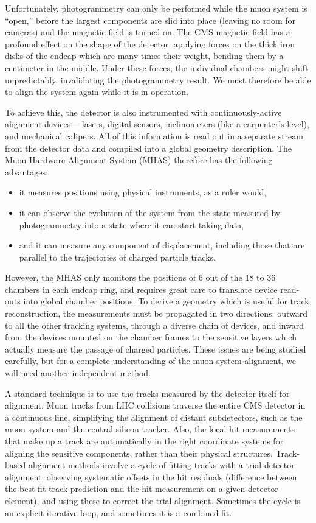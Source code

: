 \documentclass[12pt]{article}
\begin{document}
Unfortunately, photogrammetry can only be performed while the muon
system is ``open,'' before the largest components are slid into place
(leaving no room for cameras) and the magnetic field is turned on.
The CMS magnetic field has a profound effect on the shape of the
detector, applying forces on the thick iron disks of the endcap which
are many times their weight, bending them by a centimeter in the
middle.  Under these forces, the individual chambers might shift
unpredictably, invalidating the photogrammetry result.  We must
therefore be able to align the system again while it is in operation.

To achieve this, the detector is also instrumented with
continuously-active alignment devices--- lasers, digital sensors,
inclinometers (like a carpenter's level), and mechanical calipers.
All of this information is read out in a separate stream from the
detector data and compiled into a global geometry description.  The
Muon Hardware Alignment System (MHAS) therefore has the following
advantages:
\begin{itemize}
\item it measures positions using physical instruments, as a ruler
  would,
\item it can observe the evolution of the system from the state
  measured by photogrammetry into a state where it can start taking
  data,
\item and it can measure any component of displacement, including
  those that are parallel to the trajectories of charged particle
  tracks.
\end{itemize}
However, the MHAS only monitors the positions of 6 out of the 18 to 36
chambers in each endcap ring, and requires great care to translate
device read-outs into global chamber positions.  To derive a geometry
which is useful for track reconstruction, the measurements must be
propagated in two directions: outward to all the other tracking systems,
through a diverse chain of devices, and inward from the devices
mounted on the chamber frames to the sensitive layers which actually
measure the passage of charged particles.  These issues are being
studied carefully, but for a complete understanding of the muon system
alignment, we will need another independent method.

A standard technique is to use the tracks measured by the detector
itself for alignment.  Muon tracks from LHC collisions traverse the
entire CMS detector in a continuous line, simplifying the alignment of
distant subdetectors, such as the muon system and the central silicon
tracker.  Also, the local hit measurements that make up a track are
automatically in the right coordinate systems for aligning the
sensitive components, rather than their physical structures.
Track-based alignment methods involve a cycle of fitting tracks with a
trial detector alignment, observing systematic offsets in the hit
residuals (difference between the best-fit track prediction and the
hit measurement on a given detector element), and using these to
correct the trial alignment.  Sometimes the cycle is an explicit
iterative loop, and sometimes it is a combined fit.
\end{document}
